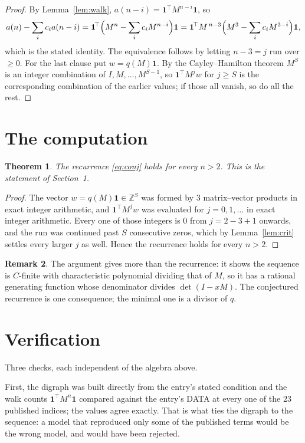 \documentclass[11pt,a4paper]{article}
\theoremstyle{plain}
\newtheorem{theorem}{Theorem}
\theoremstyle{definition}
\newtheorem{remark}[theorem]{Remark}
\begin{document}
\begin{proof}
By Lemma~\ref{lem:walk}, $a(n-i)=\mathbf{1}^{\!\top}M^{n-i}\mathbf{1}$, so
\[
a(n)-\sum_i c_i a(n-i)
=\mathbf{1}^{\!\top}\Bigl(M^{n}-\sum_i c_i M^{n-i}\Bigr)\mathbf{1}
=\mathbf{1}^{\!\top}M^{\,n-3}\Bigl(M^{3}-\sum_i c_i M^{3-i}\Bigr)\mathbf{1},
\]
which is the stated identity. The equivalence follows by letting $n-3=j$ run over
$\ge0$. For the last clause put $w=q(M)\mathbf{1}$. By the Cayley--Hamilton theorem
$M^{S}$ is an integer combination of $I,M,\dots,M^{S-1}$, so
$\mathbf{1}^{\!\top}M^{j}w$ for $j\ge S$ is the corresponding combination of the
earlier values; if those all vanish, so do all the rest.
\end{proof}

\section{The computation}

\begin{theorem}
The recurrence \eqref{eq:conj} holds for every $n>2$. This is the statement of
Section~1.
\end{theorem}

\begin{proof}
The vector $w=q(M)\mathbf{1}\in\mathbb{Z}^{S}$ was formed by $3$ matrix--vector
products in exact integer arithmetic, and $\mathbf{1}^{\!\top}M^{j}w$ was evaluated for
$j=0,1,\dots$ in exact integer arithmetic. Every one of those integers is $0$ from
$j=2-3+1$ onwards, and the run was continued past $S$ consecutive zeros, which by
Lemma~\ref{lem:crit} settles every larger $j$ as well. Hence the recurrence holds for
every $n>2$.
\end{proof}

\begin{remark}
The argument gives more than the recurrence: it shows the sequence is $C$-finite with
characteristic polynomial dividing that of $M$, so it has a rational generating function
whose denominator divides $\det(I-xM)$. The conjectured recurrence is one consequence; the
minimal one is a divisor of $q$.
\end{remark}

\section{Verification}

Three checks, each independent of the algebra above.

First, the digraph was built directly from the entry's stated condition and the walk counts
$\mathbf{1}^{\!\top}M^{n}\mathbf{1}$ compared against the entry's DATA at every one of
the $23$ published indices; the values agree exactly. That is what ties the digraph to
the sequence: a model that reproduced only some of the published terms would be the wrong
model, and would have been rejected.
\end{document}
